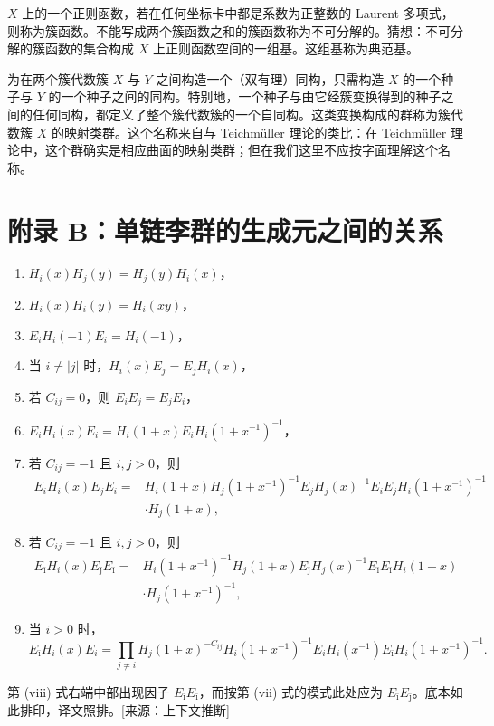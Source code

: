 $X$ 上的一个正则函数，若在任何坐标卡中都是系数为正整数的 Laurent 多项式，则称为簇函数。不能写成两个簇函数之和的簇函数称为不可分解的。猜想：不可分解的簇函数的集合构成 $X$ 上正则函数空间的一组基。这组基称为典范基。

为在两个簇代数簇 $X$ 与 $Y$ 之间构造一个（双有理）同构，只需构造 $X$ 的一个种子与 $Y$ 的一个种子之间的同构。特别地，一个种子与由它经簇变换得到的种子之间的任何同构，都定义了整个簇代数簇的一个自同构。这类变换构成的群称为簇代数簇 $X$ 的映射类群。这个名称来自与 Teichmüller 理论的类比：在 Teichmüller 理论中，这个群确实是相应曲面的映射类群；但在我们这里不应按字面理解这个名称。

\section{附录 B：单链李群的生成元之间的关系}

\begin{enumerate}[label=(\roman*),leftmargin=3em,itemsep=2pt]
\item $H_i(x)H_j(y)=H_j(y)H_i(x)$，
\item $H_i(x)H_i(y)=H_i(xy)$，
\item $E_iH_i(-1)E_i=H_i(-1)$，
\item 当 $i\neq|j|$ 时，$H_i(x)E_j=E_jH_i(x)$，
\item 若 $C_{ij}=0$，则 $E_iE_j=E_jE_i$，
\item $E_iH_i(x)E_i=H_i(1+x)E_iH_i(1+x^{-1})^{-1}$，
\item 若 $C_{ij}=-1$ 且 $i,j>0$，则
\[
\begin{aligned}
E_iH_i(x)E_jE_i={}&H_i(1+x)H_j(1+x^{-1})^{-1}E_jH_j(x)^{-1}E_iE_jH_i(1+x^{-1})^{-1}\\
&\cdot H_j(1+x),
\end{aligned}
\]
\item 若 $C_{ij}=-1$ 且 $i,j>0$，则
\[
\begin{aligned}
E_{\bar\imath}H_i(x)E_{\bar\jmath}E_{\bar\imath}={}&H_i(1+x^{-1})^{-1}H_j(1+x)E_{\bar\jmath}H_j(x)^{-1}E_{\bar\imath}E_{\bar\imath}H_i(1+x)\\
&\cdot H_j(1+x^{-1})^{-1},
\end{aligned}
\]
\item 当 $i>0$ 时，
\[
E_{\bar\imath}H_i(x)E_i=\prod_{j\neq i}H_j(1+x)^{-C_{ij}}H_i(1+x^{-1})^{-1}E_iH_i(x^{-1})E_{\bar\imath}H_i(1+x^{-1})^{-1}.
\]
\end{enumerate}
\begin{annote}第 (viii) 式右端中部出现因子 $E_{\bar\imath}E_{\bar\imath}$，而按第 (vii) 式的模式此处应为 $E_{\bar\imath}E_{\bar\jmath}$。底本如此排印，译文照排。[来源：上下文推断]\end{annote}

